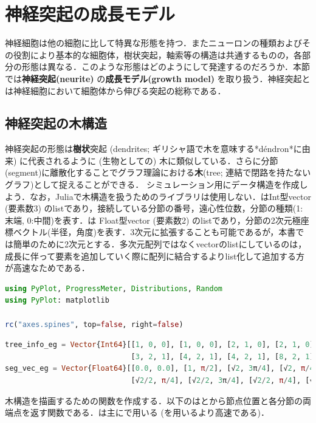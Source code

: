 \section{神経突起の成長モデル}
神経細胞は他の細胞に比して特異な形態を持つ．またニューロンの種類およびその役割により基本的な細胞体，樹状突起，軸索等の構造は共通するものの，各部分の形態は異なる．このような形態はどのようにして発達するのだろうか．本節では\textbf{神経突起(neurite)} の\textbf{成長モデル(growth model)} を取り扱う．神経突起とは神経細胞において細胞体から伸びる突起の総称である．
\subsection{神経突起の木構造}
神経突起の形態は\textbf{樹状}突起 (dendrites; ギリシャ語で木を意味する*déndron*に由来) に代表されるように (生物としての) 木に類似している．さらに分節(segment)に離散化することでグラフ理論における\textbf{木}(tree; 連結で閉路を持たないグラフ)として捉えることができる．
シミュレーション用にデータ構造を作成しよう．なお，Juliaで木構造を扱うためのライブラリは使用しない．はInt型vector (要素数3) のlistであり，接続している分節の番号，遠心性位数，分節の種類(1: 末端, 0:中間)を表す．は Float型vector (要素数2) のlistであり，分節の2次元極座標ベクトル(半径，角度)を表す．3次元に拡張することも可能であるが，本書では簡単のために2次元とする．多次元配列ではなくvectorのlistにしているのは，成長に伴って要素を追加していく際に配列に結合するよりlist化して追加する方が高速なためである．
\begin{lstlisting}[language=julia]
using PyPlot, ProgressMeter, Distributions, Random
using PyPlot: matplotlib

rc("axes.spines", top=false, right=false)
\end{lstlisting}
\begin{lstlisting}[language=julia]
tree_info_eg = Vector{Int64}[[1, 0, 0], [1, 0, 0], [2, 1, 0], [2, 1, 0], [3, 2, 1], 
                             [3, 2, 1], [4, 2, 1], [4, 2, 1], [8, 2, 1], [9, 2, 1], [9, 2, 1]];
seg_vec_eg = Vector{Float64}[[0.0, 0.0], [1, π/2], [√2, 3π/4], [√2, π/4], [√2/2, 3π/4],
                             [√2/2, π/4], [√2/2, 3π/4], [√2/2, π/4], [√2/2, π/4], [√2/2, 3π/4], [√2/2, π/4]];
\end{lstlisting}
木構造を描画するための関数を作成する．以下のはとから節点位置と各分節の両端点を返す関数である．は主にで用いる (を用いるより高速である)．

